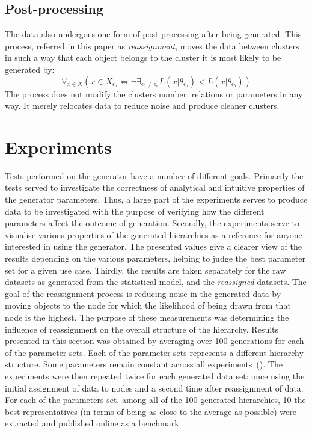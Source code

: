 \documentclass{article}
\begin{document}
	\subsection{Post-processing}
	The data also undergoes one form of post-processing after being generated. This process, referred in this paper as \textit{reassignment}, moves the data between clusters in such a way that each object belongs to the cluster it is most likely to be generated by:
	\begin{equation}
	\forall_{x \in X}\left( x \in X_{\epsilon_a}\Leftrightarrow \neg\exists_{\epsilon_b \neq \epsilon_a}L(x|\theta_{\epsilon_a})<L(x|\theta_{\epsilon_b})\right )
	\end{equation}
	The process does not modify the clusters number, relations or parameters in any way. It merely relocates data to reduce noise and produce cleaner clusters.
	\section{Experiments}
	\label{experiments}
	Tests performed on the generator have a number of different goals. Primarily the tests served to investigate the correctness of analytical and intuitive properties of the generator parameters. Thus, a large part of the experiments serves to produce data to be investigated with the purpose of verifying how the different parameters affect the outcome of generation. Secondly, the experiments serve to visualise various properties of the generated hierarchies as a reference for anyone interested in using the generator. The presented values give a clearer view of the results depending on the various parameters, helping to judge the best parameter set for a given use case. Thirdly, the results are taken separately for the raw datasets as generated from the statistical model, and the \textit{reassigned} datasets. The goal of the reassignment process is reducing noise in the generated data by moving objects to the node for which the likelihood of being drawn from that node is the highest. The purpose of these measurements was determining the influence of reassignment on the overall structure of the hierarchy.
    Results presented in this section was obtained by averaging over 100 generations for each of the parameter sets. Each of the parameter sets represents a different hierarchy structure. Some parameters remain constant across all experiments~(). The experiments were then repeated twice for each generated data set: once using the initial assignment of data to nodes and a second time after reassignment of data. For each of the parameters set, among all of the 100 generated hierarchies, 10 the best representatives (in terms of being as close to the average as possible)  were extracted and published online as a benchmark.
	
\end{document}
